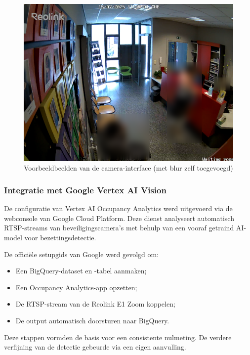 \begin{figure}[h!]
    \begin{minipage}[b]{0.5\textwidth}
        \centering
        \includegraphics[width=\textwidth]{img/bp/vertex/camera_image_waitingroom_blurred.png}
    \end{minipage}
    
    \caption{Voorbeeldbeelden van de camera-interface (met blur zelf toegevoegd)}
    \label{fig:wgc-vertex-camera}
\end{figure}


\subsubsection{Integratie met Google Vertex AI Vision}
De configuratie van Vertex AI Occupancy Analytics werd uitgevoerd via de webconsole van Google Cloud Platform. Deze dienst analyseert automatisch RTSP-streams van beveiligingscamera’s met behulp van een vooraf getraind AI-model voor bezettingsdetectie.

De officiële setupgids van Google \autocite{Cloud} werd gevolgd om:
\begin{itemize}
    \item Een BigQuery-dataset en -tabel aanmaken;
    \item Een Occupancy Analytics-app opzetten;
    \item De RTSP-stream van de Reolink E1 Zoom koppelen;
    \item De output automatisch doorsturen naar BigQuery.
\end{itemize}

Deze stappen vormden de basis voor een consistente nulmeting. De verdere verfijning van de detectie gebeurde via een eigen aanvulling.

